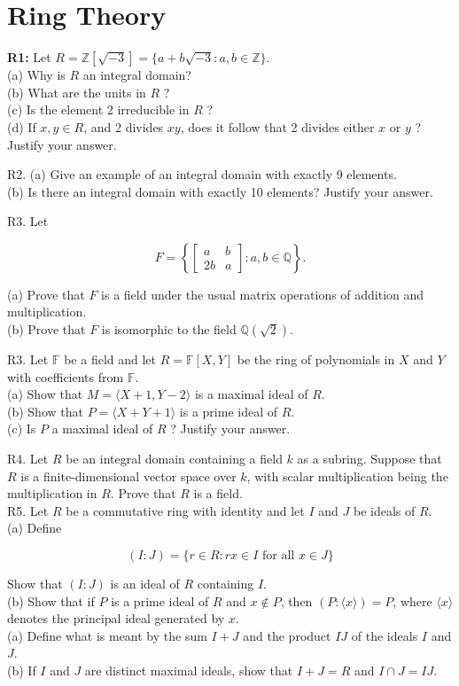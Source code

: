 \chapter{Ring Theory}
\textbf{R1:} Let $R=\mathbb{Z}[\sqrt{-3}]=\{a+b \sqrt{-3}: a, b \in \mathbb{Z}\}$.\\
(a) Why is $R$ an integral domain?\\
(b) What are the units in $R$ ?\\
(c) Is the element 2 irreducible in $R$ ?\\
(d) If $x, y \in R$, and 2 divides $x y$, does it follow that 2 divides either $x$ or $y$ ? Justify your answer.

R2. (a) Give an example of an integral domain with exactly 9 elements.\\
(b) Is there an integral domain with exactly 10 elements? Justify your answer.

R3. Let

$$
F=\left\{\left[\begin{array}{cc}
	a & b \\
	2 b & a
\end{array}\right]: a, b \in \mathbb{Q}\right\} .
$$

(a) Prove that $F$ is a field under the usual matrix operations of addition and multiplication.\\
(b) Prove that $F$ is isomorphic to the field $\mathbb{Q}(\sqrt{2})$.

R3. Let $\mathbb{F}$ be a field and let $R=\mathbb{F}[X, Y]$ be the ring of polynomials in $X$ and $Y$ with coefficients from $\mathbb{F}$.\\
(a) Show that $M=\langle X+1, Y-2\rangle$ is a maximal ideal of $R$.\\
(b) Show that $P=\langle X+Y+1\rangle$ is a prime ideal of $R$.\\
(c) Is $P$ a maximal ideal of $R$ ? Justify your answer.

R4. Let $R$ be an integral domain containing a field $k$ as a subring. Suppose that $R$ is a finite-dimensional vector space over $k$, with scalar multiplication being the multiplication in $R$. Prove that $R$ is a field.\\
R5. Let $R$ be a commutative ring with identity and let $I$ and $J$ be ideals of $R$.\\
(a) Define

$$
(I: J)=\{r \in R: r x \in I \text { for all } x \in J\}
$$

Show that $(I: J)$ is an ideal of $R$ containing $I$.\\
(b) Show that if $P$ is a prime ideal of $R$ and $x \notin P$, then $(P:\langle x\rangle)=P$, where $\langle x\rangle$ denotes the principal ideal generated by $x$.\\
(a) Define what is meant by the sum $I+J$ and the product $I J$ of the ideals $I$ and $J$.\\
(b) If $I$ and $J$ are distinct maximal ideals, show that $I+J=R$ and $I \cap J=I J$.

